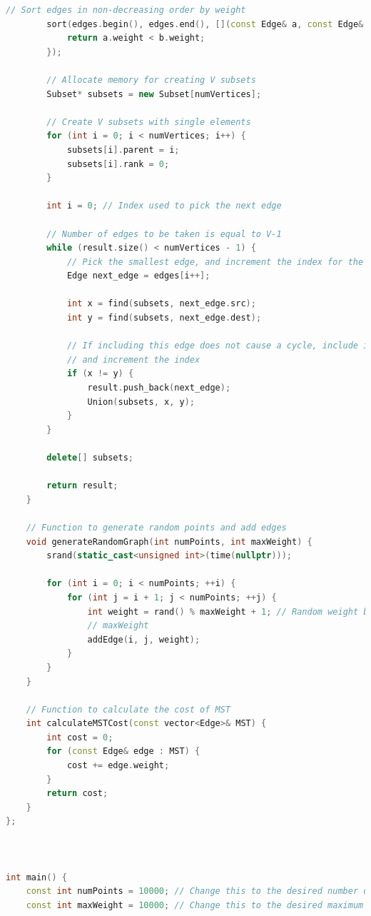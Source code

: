 \documentclass[a4paper, 10pt, twocolumn]{article}
\begin{document}
\begin{lstlisting}[language=C++, caption={C++ code for Efficient Kruskal's Algorithm using Merge Sort}]
        // Sort edges in non-decreasing order by weight
        sort(edges.begin(), edges.end(), [](const Edge& a, const Edge& b) {
            return a.weight < b.weight;
        });

        // Allocate memory for creating V subsets
        Subset* subsets = new Subset[numVertices];

        // Create V subsets with single elements
        for (int i = 0; i < numVertices; i++) {
            subsets[i].parent = i;
            subsets[i].rank = 0;
        }

        int i = 0; // Index used to pick the next edge

        // Number of edges to be taken is equal to V-1
        while (result.size() < numVertices - 1) {
            // Pick the smallest edge, and increment the index for the next iteration
            Edge next_edge = edges[i++];

            int x = find(subsets, next_edge.src);
            int y = find(subsets, next_edge.dest);

            // If including this edge does not cause a cycle, include it in the result 
            // and increment the index
            if (x != y) {
                result.push_back(next_edge);
                Union(subsets, x, y);
            }
        }

        delete[] subsets;

        return result;
    }

    // Function to generate random points and add edges
    void generateRandomGraph(int numPoints, int maxWeight) {
        srand(static_cast<unsigned int>(time(nullptr)));

        for (int i = 0; i < numPoints; ++i) {
            for (int j = i + 1; j < numPoints; ++j) {
                int weight = rand() % maxWeight + 1; // Random weight between 1 and 
                // maxWeight
                addEdge(i, j, weight);
            }
        }
    }

    // Function to calculate the cost of MST
    int calculateMSTCost(const vector<Edge>& MST) {
        int cost = 0;
        for (const Edge& edge : MST) {
            cost += edge.weight;
        }
        return cost;
    }
};



int main() {
    const int numPoints = 10000; // Change this to the desired number of points
    const int maxWeight = 10000; // Change this to the desired maximum weight for edges


\end{lstlisting}
\end{document}
